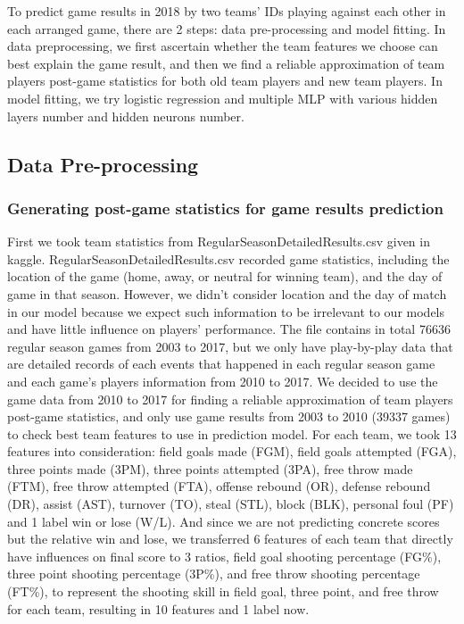 \documentclass[12pt]{article}
\begin{document}
\quad To predict game results in 2018 by two teams' IDs playing against each other in each arranged game, there are 2 steps: data pre-processing and model fitting. In data preprocessing, we first ascertain whether the team features we choose can best explain the game result, and then we find a reliable approximation of team players post-game statistics for both old team players and new team players. In model fitting, we try logistic regression and multiple MLP with various hidden layers number and hidden neurons number.

\subsection{Data Pre-processing}



\subsubsection{Generating post-game statistics for game results prediction}

\quad First we took team statistics from RegularSeasonDetailedResults.csv given in kaggle. RegularSeasonDetailedResults.csv recorded game statistics, including the location of the game (home, away, or neutral for winning team), and the day of game in that season. However, we didn’t consider location and the day of match in our model because we expect such information to be irrelevant to our models and have little influence on players’ performance. The file contains in total 76636 regular season games from 2003 to 2017, but we only have play-by-play data that are detailed records of each events that happened in each regular season game and each game’s players information from 2010 to 2017. We decided to use the game data from 2010 to 2017 for finding a reliable approximation of team players post-game statistics, and only use game results from 2003 to 2010 (39337 games) to check best team features to use in prediction model. For each team, we took 13 features into consideration: field goals made (FGM), field goals attempted (FGA), three points made (3PM), three points attempted (3PA), free throw made (FTM), free throw attempted (FTA), offense rebound (OR), defense rebound (DR), assist (AST), turnover (TO), steal (STL), block (BLK), personal foul (PF) and 1 label win or lose (W/L). And since we are not predicting concrete scores but the relative win and lose, we transferred 6 features of each team that directly have influences on final score to 3 ratios, field goal shooting percentage (FG\%), three point shooting percentage (3P\%), and free throw shooting percentage (FT\%), to represent the shooting skill in field goal, three point, and free throw for each team, resulting in 10 features and 1 label now.
\end{document}
